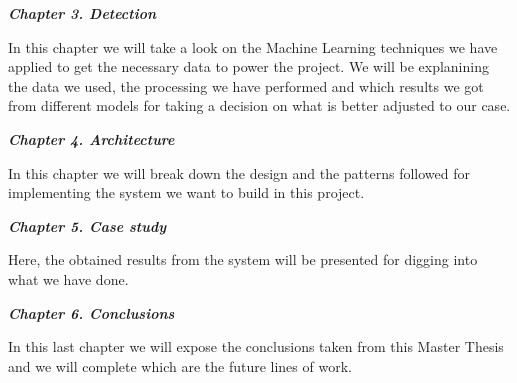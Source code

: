 \textbf{\textit{Chapter 3. Detection}} 

In this chapter we will take a look on the Machine Learning techniques we have applied to get the necessary data to power the project. We will be explanining the data we used, the processing we have performed and which results we got from different models for taking a decision on what is better adjusted to our case.

\textbf{\textit{Chapter 4. Architecture}} 

In this chapter we will break down the design and the patterns followed for implementing the system we want to build in this project.

\textbf{\textit{Chapter 5. Case study}}

Here, the obtained results from the system will be presented for digging into what we have done.

\textbf{\textit{Chapter 6. Conclusions}} 

In this last chapter we will expose the conclusions taken from this Master Thesis and we will complete which are the future lines of work.
